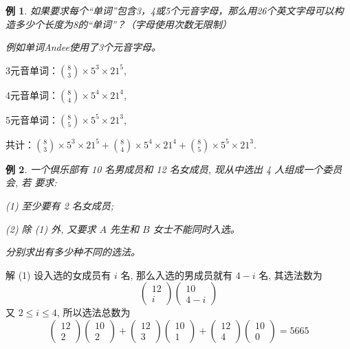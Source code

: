 \documentclass[13pt, punct]{ctexbeamer}
\newtheorem{ex}{例}[section]
\begin{document}
\begin{frame}
\begin{ex}
如果要求每个``单词''包含3，4或5个元音字母，那么用26个英文字母可以构造多少个长度为8的``单词''？（字母使用次数无限制）


例如单词Andee使用了3个元音字母。
\end{ex}
\pause
3元音单词：$\binom{8}{3}\times 5^3 \times 21^5$,

4元音单词：$\binom{8}{4}\times 5^4 \times 21^4$,

5元音单词：$\binom{8}{5}\times 5^5 \times 21^3$,

共计：$\binom{8}{3}\times 5^3 \times 21^5 + \binom{8}{4}\times 5^4 \times 21^4 + \binom{8}{5}\times 5^5 \times 21^3$.

\end{frame}

\begin{frame}
    \begin{ex} 一个倶乐部有 10 名男成员和 12 名女成员, 现从中选出 4 人组成一个委员会, 若 要求:

(1) 至少要有 2 名女成员;

(2) 除 (1) 外, 又要求 $A$ 先生和 $B$ 女士不能同时入选。

分别求出有多少种不同的选法。
\end{ex}
\pause
解 (1) 设入选的女成员有 $i$ 名, 那么入选的男成员就有 $4-i$ 名, 其选法数为
$$
\left(\begin{array}{c}
    12 \\
    i
\end{array}\right)\left(\begin{array}{c}
    10 \\
    4-i
\end{array}\right)
$$
又 $2 \leqslant i \leqslant 4$, 所以选法总数为
$$
\left(\begin{array}{c}
    12 \\
    2
\end{array}\right)\left(\begin{array}{c}
    10 \\
    2
\end{array}\right)+\left(\begin{array}{c}
    12 \\
    3
\end{array}\right)\left(\begin{array}{c}
    10 \\
    1
\end{array}\right)+\left(\begin{array}{c}
    12 \\
    4
\end{array}\right)\left(\begin{array}{c}
    10 \\
    0
\end{array}\right)=5665
$$
\end{frame}
\end{document}
